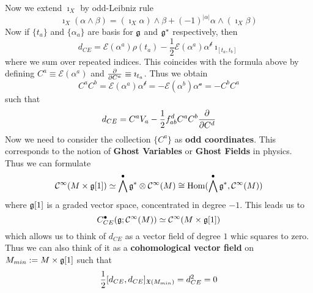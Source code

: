 Now we extend $\imath_X$ by odd-Leibniz rule
$$ \imath_X(\alpha \wedge \beta) = (\imath_X \alpha) \wedge \beta + (-1)^{|\alpha|} \alpha \wedge (\imath_X \beta) $$
Now if $\{t_a\}$ and $\{\alpha_a\}$ are basis for $\mathfrak{g}$ and $\mathfrak{g}^*$ respectively, then
$$ d_{CE} = \mathcal{E}(\alpha^a) \rho(t_a) - \frac{1}{2} \mathcal{E}(\alpha^a) \mathcal{\alpha^b} \imath_{[t_a, t_b]} $$
where we sum over repeated indices. This coincides with the formula above by defining $C^a \equiv \mathcal{E}(\alpha^a)$ and $\frac{\partial }{\partial C^a} \equiv \imath_{t_a}$. Thus we obtain
$$ C^a C^b = \mathcal{E}(\alpha^a) \mathcal{\alpha^b} = - \mathcal{E}(\alpha^b) \mathcal{\alpha^a} = - C^b C^a $$
such that
$$ d_{CE} = C^a V_a - \frac{1}{2} f_{ab}^d C^a C^b \frac{\partial }{\partial C^d} $$
Now we need to consider the collection $\{C^a\}$ as \textbf{odd coordinates}. This corresponds to the notion of \textbf{Ghost Variables} or \textbf{Ghost Fields} in physics. Thus we can formulate
$$ \mathcal{C}^{\infty}(M \times \mathfrak{g}[1]) \simeq \bigwedge^\bullet \mathfrak{g}^* \otimes \mathcal{C}^{\infty}(M) \cong \operatorname{Hom}(\bigwedge^\bullet \mathfrak{g}^*, \mathcal{C}^{\infty}(M)) $$
where $\mathfrak{g}[1]$ is a graded vector space, concentrated in degree $-1$. This leads us to
$$ C_{CE}^\bullet (\mathfrak{g} ; \mathcal{C}^{\infty}(M)) \simeq \mathcal{C}^{\infty}(M \times \mathfrak{g}[1]) $$
which allows us to think of $d_{CE}$ as a vector field of degree $1$ whic squares to zero. Thus we can also think of it as a \textbf{cohomological vector field} on $M_{min}:=M \times \mathfrak{g}[1]$ such that
$$ \frac{1}{2} [d_{CE}, d_{CE}]_{\mathfrak{X}(M_{min})} = d_{CE}^2 = 0 $$




\newpage
